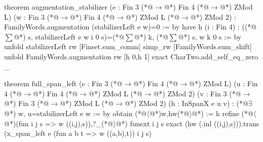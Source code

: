 theorem augmentation_stabilizer (e : Fin 3 (*@$\to$@*) Fin 4 (*@$\to$@*) ZMod L)
    (w : Fin 3 (*@$\to$@*) Fin 4 (*@$\to$@*) ZMod L (*@$\to$@*) ZMod 2) :
    FamilyWords.augmentation (stabilizerLeft e w)=0 := by
  have h (i : Fin 4) : ((*@$\sum$@*) s, stabilizerLeft e w i 0 s)=(*@$\sum$@*) k, (*@$\sum$@*) s, w k 0 s := by
    unfold stabilizerLeft
    rw [Finset.sum_comm]
    simp_rw [FamilyWords.sum_shift]
  unfold FamilyWords.augmentation
  rw [h 0,h 1]
  exact CharTwo.add_self_eq_zero _

theorem full_span_left (e : Fin 3 (*@$\to$@*) Fin 4 (*@$\to$@*) ZMod L)
    (u : Fin 4 (*@$\to$@*) Fin 4 (*@$\to$@*) ZMod L (*@$\to$@*) ZMod 2) (v : Fin 3 (*@$\to$@*) Fin 3 (*@$\to$@*) ZMod L (*@$\to$@*) ZMod 2)
    (h : InSpanX e u v) : (*@$\exists$@*) w, u=stabilizerLeft e w := by
  obtain (*@$\langle$@*)w,hw(*@$\rangle$@*) := h
  refine (*@$\langle$@*)(fun i j s => w ((i,j),s)),?_(*@$\rangle$@*)
  funext i j s
  exact (hw (.inl ((i,j),s))).trans (x_span_left e (fun a b t => w ((a,b),t)) i j s)
